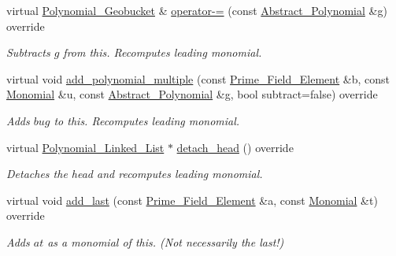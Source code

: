 \begin{Indent}
\begin{DoxyCompactItemize}
\mbox{\label{group__polygroup_adceeadff156d68eb4af0492d5cbd46b5}} 
virtual \hyperlink{group__polygroup_class_polynomial___geobucket}{Polynomial\+\_\+\+Geobucket} \& \hyperlink{group__polygroup_adceeadff156d68eb4af0492d5cbd46b5}{operator-\/=} (const \hyperlink{group__polygroup_class_abstract___polynomial}{Abstract\+\_\+\+Polynomial} \&g) override
\begin{DoxyCompactList}\small\item\em Subtracts $g$ from {\ttfamily this}. Recomputes leading monomial. \end{DoxyCompactList}\item 
\mbox{\label{group__polygroup_a69a7a060044c2cb3aa32ba5c321a9eb4}} 
virtual void \hyperlink{group__polygroup_a69a7a060044c2cb3aa32ba5c321a9eb4}{add\+\_\+polynomial\+\_\+multiple} (const \hyperlink{group___fields_group_class_prime___field___element}{Prime\+\_\+\+Field\+\_\+\+Element} \&b, const \hyperlink{group__polygroup_class_monomial}{Monomial} \&u, const \hyperlink{group__polygroup_class_abstract___polynomial}{Abstract\+\_\+\+Polynomial} \&g, bool subtract=false) override
\begin{DoxyCompactList}\small\item\em Adds $bug$ to {\ttfamily this}. Recomputes leading monomial. \end{DoxyCompactList}\item 
\mbox{\label{group__polygroup_a57606623bed3fcd4f7b38530af211346}} 
virtual \hyperlink{group__polygroup_class_polynomial___linked___list}{Polynomial\+\_\+\+Linked\+\_\+\+List} $\ast$ \hyperlink{group__polygroup_a57606623bed3fcd4f7b38530af211346}{detach\+\_\+head} () override
\begin{DoxyCompactList}\small\item\em Detaches the head and recomputes leading monomial. \end{DoxyCompactList}\item 
virtual void \hyperlink{group__polygroup_ada4a539d3666cd6801a75c8861bc35fa}{add\+\_\+last} (const \hyperlink{group___fields_group_class_prime___field___element}{Prime\+\_\+\+Field\+\_\+\+Element} \&a, const \hyperlink{group__polygroup_class_monomial}{Monomial} \&t) override
\begin{DoxyCompactList}\small\item\em Adds $at$ as a monomial of {\ttfamily this}. (Not necessarily the last!) \end{DoxyCompactList}\item 

\end{DoxyCompactItemize}
\end{Indent}
